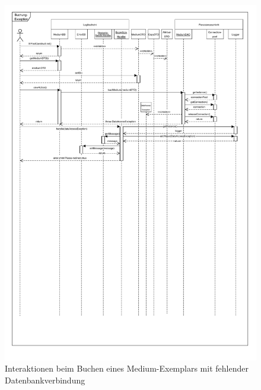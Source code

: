 \documentclass{article}
\begin{document}
\begin{figure}[h]
	\hypertarget{Fehlersequenz}{}
    \centering
    \includegraphics[width = 50em]{Sequenzdiagramm-exception-v4.1}
    \caption{Interaktionen beim Buchen eines Medium-Exemplars mit fehlender Datenbankverbindung}
    \label{Sequenzdiagramm}
\end{figure}

\restoregeometry
\newpage

\end{document}
